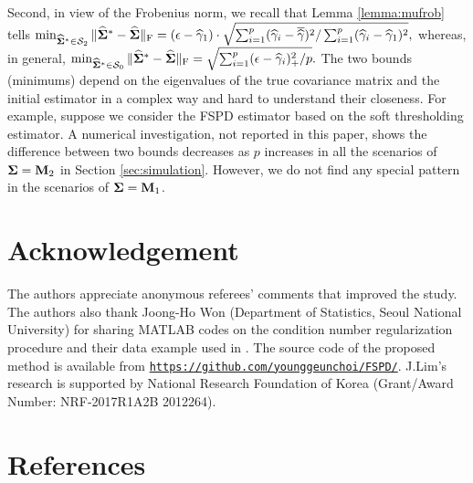 \documentclass[times,sort&compress,3p]{elsarticle}
\newcommand{\MC}{\mathcal}
\begin{document}
 Second, in view of the Frobenius norm, we recall that  Lemma \ref{lemma:mufrob} tells
 $
 \min_{\widehat{\bf \Sigma}^* \in \MC{S}_2} \| \widehat{\bf \Sigma}^* - \widehat{\bf \Sigma} \|_{\rm F}  = (\epsilon - \widehat{\gamma}_{1}) \cdot
 \sqrt{ \sum_{i=1}^p ({\widehat{\gamma}}_i - {\overline{\widehat{\gamma}}})^2 / \sum_{i=1}^p ({\widehat{\gamma}}_i - {\widehat{\gamma}}_1)^2 },
 $
 whereas, in general,
 $
 \min_{\widehat{\bf \Sigma}^* \in \MC{S}_0} \| \widehat{\bf \Sigma}^* - \widehat{\bf \Sigma} \|_{\rm F}
 = \sqrt{ \sum_{i=1}^{p} (\epsilon - \widehat{\gamma}_i)_+^2 / p }.
 $ 
The two bounds (minimums) depend on the eigenvalues of the true covariance matrix 
and the initial estimator in a complex way and hard to understand their closeness. For example, 
suppose we consider the FSPD estimator based on the soft thresholding estimator. 
A numerical investigation, not reported in this paper, shows the difference between two 
bounds decreases as $p$ increases in all the scenarios of ${\bf \Sigma}={\bf M}_2$ 
in Section \ref{sec:simulation}. However, we do not find any special pattern in the scenarios
of ${\bf \Sigma}={\bf M}_1$. 


\section*{Acknowledgement}

The authors appreciate anonymous referees' comments that improved the study.
The authors also thank Joong-Ho Won (Department of Statistics, Seoul National University) 
for sharing \textsf{MATLAB} codes on the condition number regularization procedure and their data example 
used in \cite{Won2013}. The source code of the proposed method is available from \texttt{\url{https://github.com/younggeunchoi/FSPD/}}.
J.Lim's research is supported by National Research Foundation of Korea (Grant/Award Number: NRF-2017R1A2B 2012264).
\bigskip


%

\section*{References}
\end{document}
